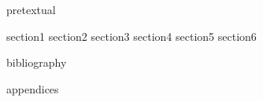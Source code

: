 \documentclass[11pt]{report}
\begin{document}
{pretextual}

{section1}
{section2}
{section3}
{section4}
{section5}
{section6}

{bibliography}

\clearpage

{appendices}
\end{document}
